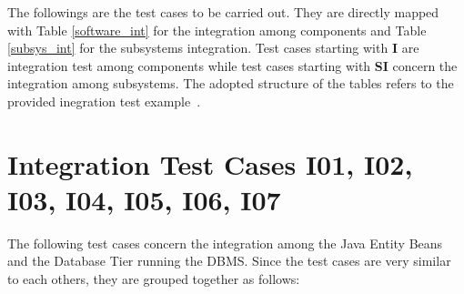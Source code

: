 The followings are the test cases to be carried out. They are directly mapped with Table \ref{software_int} for the integration among components and Table \ref{subsys_int} for the subsystems integration. Test cases starting with \textbf{I} are integration test among components while test cases starting with \textbf{SI} concern the integration among subsystems. The adopted structure of the tables refers to the provided inegration test example~\cite{testplan_ex}.

\section{Integration Test Cases I01, I02, I03, I04, I05, I06, I07}

The following test cases concern the integration among the Java Entity Beans and the Database Tier running the DBMS. Since the test cases are very similar to each others, they are grouped together as follows:

